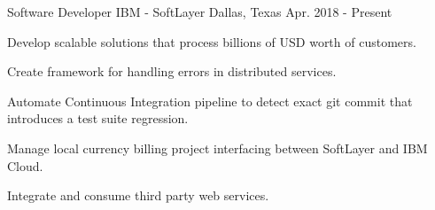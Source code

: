 
\begin{cventries}
	
	\cventry
	{Software Developer}
	{IBM - SoftLayer}
	{Dallas, Texas}
	{Apr. 2018 - Present}
	{
		\begin{cvitems}
			\item {Develop scalable solutions that process billions of USD worth of customers.}
			\item {Create framework for handling errors in distributed services.}
			\item {Automate Continuous Integration pipeline to detect exact git commit that introduces a test suite regression.}
			\item {Manage local currency billing project interfacing between SoftLayer and IBM Cloud.}
			\item {Integrate and consume third party web services.}
		\end{cvitems}
	}
	
%	


\end{cventries}
